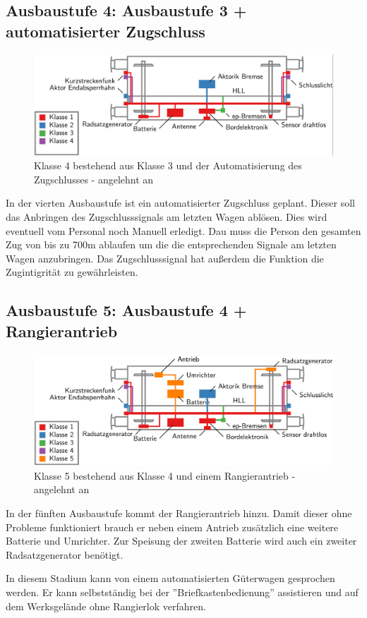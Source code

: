 \subsection{Ausbaustufe 4: Ausbaustufe 3 + automatisierter Zugschluss}
\begin{figure}[htbp] 
    \includegraphics[width=\textwidth]{Bilder/Ausbaustufen_4.PNG}
    \caption{Klasse 4 bestehend aus Klasse 3 und der Automatisierung des Zugschlusses - angelehnt an \cite{ETR_3}}
    \label{fig:Klasse4}
\end{figure} 
In der vierten Ausbaustufe ist ein automatisierter Zugschluss geplant. Dieser soll das Anbringen des Zugschlusssignals am letzten Wagen ablösen. Dies wird eventuell vom Personal noch Manuell erledigt. Dau muss die Person den gesamten Zug von bis zu 700m ablaufen um die die entsprechenden Signale am letzten Wagen anzubringen. Das Zugschlusssignal hat außerdem die Funktion die Zugintigrität zu gewährleisten. 
\subsection{Ausbaustufe 5: Ausbaustufe 4 + Rangierantrieb}
\begin{figure}[htbp] 
    \includegraphics[width=\textwidth]{Bilder/Ausbaustufen_5.PNG}
    \caption{Klasse 5 bestehend aus Klasse 4 und einem Rangierantrieb - angelehnt an \cite{ETR_3}}
    \label{fig:Klasse5}
\end{figure} 
In der fünften Ausbaustufe kommt der Rangierantrieb hinzu. Damit dieser ohne Probleme funktioniert brauch er neben einem Antrieb zusätzlich eine weitere Batterie und Umrichter. Zur Speisung der zweiten Batterie wird auch ein zweiter Radsatzgenerator benötigt.\par
In diesem Stadium kann von einem automatisierten Güterwagen gesprochen werden. Er kann selbstständig bei der ''Briefkastenbedienung'' assistieren und auf dem Werksgelände ohne Rangierlok verfahren.\par

